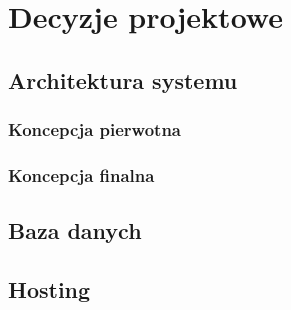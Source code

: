 \chapter{Decyzje projektowe}

\section{Architektura systemu}
\subsection{Koncepcja pierwotna}

\subsection{Koncepcja finalna}

\section{Baza danych}

\section{Hosting}
